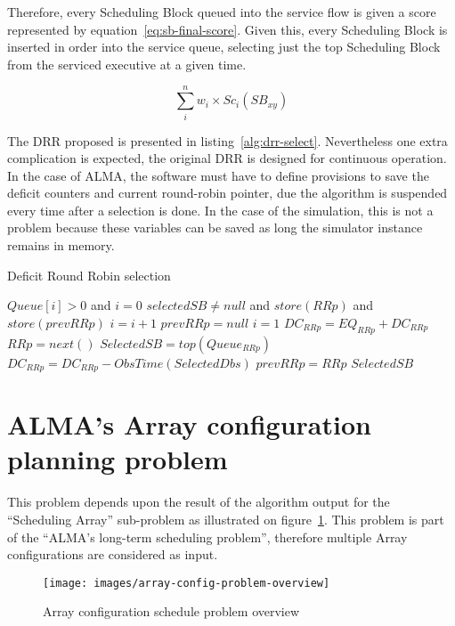 Therefore, every Scheduling Block queued into the service flow is given a score represented by equation~\ref{eq:sb-final-score}. Given this, every Scheduling Block is inserted in order into the service queue, selecting just the top Scheduling Block from the serviced executive at a given time.

\begin{equation}
\label{eq:sb-final-score}
\sum_{i}^{n} w_i\times Sc_i(SB_{xy})
\end{equation}

The DRR proposed is presented in listing~\ref{alg:drr-select}. Nevertheless one extra complication is expected, the original DRR is designed for continuous operation. In the case of ALMA, the software must have to define provisions to save the deficit counters and current round-robin pointer, due the algorithm is suspended every time after a selection is done. In the case of the simulation, this is not a problem because these variables can be saved as long the simulator instance remains in memory.

\begin{algorithm}                     
\caption{Deficit Round Robin selection}          
\label{alg:drr-select}                   
\begin{algorithmic}                    
    \REQUIRE $Queue[i] > 0$ and $i = 0$
    \ENSURE $selectedSB \neq null$ and $store(RRp)$ and $store(prevRRp)$
    \REPEAT
    \STATE $i = i + 1$
    \STATE $prevRRp = null$
    \STATE $i = 1$
    \ENDIF
    \STATE $DC_{RRp} = EQ_{RRp} + DC_{RRp}$
    \ENDIF
    \STATE  $RRp = next()$
    \ENDIF
    \STATE $SelectedSB = top(Queue_{RRp})$
    \STATE $DC_{RRp} = DC_{RRp} - ObsTime(SelectedDbs)$
    \STATE $prevRRp = RRp$
    \ENDIF
    \RETURN  $SelectedSB$
\end{algorithmic}
\end{algorithm}


\section{ALMA's Array configuration planning problem}
\label{sec:array-config-plan}
This problem depends upon the result of the algorithm output for the ``Scheduling Array'' sub-problem as illustrated on figure~\ref{fig:array-config-problem-overview}. This problem is part of the ``ALMA's  long-term scheduling problem'', therefore multiple Array configurations are considered as input.
\begin{figure}[h!]
\begin{center}
\texttt{[image: images/array-config-problem-overview]}
\end{center}
\caption{Array configuration schedule problem overview}
\label{fig:array-config-problem-overview}
\end{figure}

